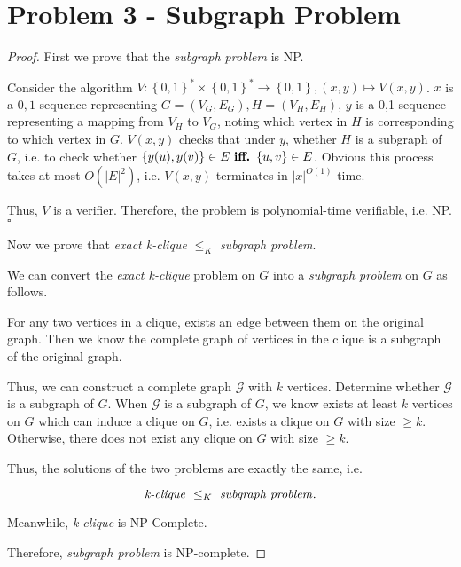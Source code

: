 \documentclass{article}
\newcommand{\whiteqed}{\hfill $\square$\par}
\newcommand{\set}[1]{\left\{#1\right\}}
\begin{document}
\vspace{1em}
\section{Problem 3 - Subgraph Problem}
\vspace{1em}
\begin{proof}
    First we prove that the \textit{subgraph problem} is NP.
    
    \hspace{1.3em}
    Consider the algorithm $V:\set{0,1}^*\times\set{0,1}^*\rightarrow\set{0,1},(x,y)\mapsto V(x,y)$. $x$ is a $0,1$-sequence representing $G=(V_G,E_G),H=(V_H,E_H)$, $y$ is a 0,1-sequence representing a mapping from $V_H$ to $V_G$, noting which vertex in $H$ is corresponding to which vertex in $G$. $V(x,y)$ checks that under $y$, whether $H$ is a subgraph of $G$, i.e. to check whether $\set{y(u),y(v)}\in E\text{\ \textbf{iff.}\ }\set{u,v}\in E$. Obvious this process takes at most $O(|E|^2)$, i.e. $V(x,y)$ terminates in $|x|^{O(1)}$ time.
    
    \hspace{1.3em}
    Thus, $V$ is a verifier. Therefore, the problem is polynomial-time verifiable, i.e. NP. \whiteqed
    
    \vspace{1em} \hspace{1.3em}
    Now we prove that \textit{exact k-clique} $\le_K$ \textit{subgraph problem}.
    
    \hspace{1.3em}
    We can convert the \textit{exact k-clique} problem on $G$ into a \textit{subgraph problem} on $G$ as follows.
    
    \hspace{1.3em}
    For any two vertices in a clique, exists an edge between them on the original graph. Then we know the complete graph of vertices in the clique is a subgraph of the original graph.
    
    \hspace{1.3em}
    Thus, we can construct a complete graph $\mathcal{G}$ with $k$ vertices. Determine whether $\mathcal{G}$ is a subgraph of $G$. When $\mathcal{G}$ is a subgraph of $G$, we know exists at least $k$ vertices on $G$ which can induce a clique on $G$, i.e. exists a clique on $G$ with size $\geq k$. Otherwise, there does not exist any clique on $G$ with size $\geq k$. 
    
    \hspace{1.3em}
    Thus, the solutions of the two problems are exactly the same, i.e.
    
    \vspace{-1.5em}
    $$\text{\textit{k-clique}}\ \le_K\ \text{\textit{subgraph problem}}.$$
    
    \hspace{1.3em}
    Meanwhile, \textit{k-clique} is NP-Complete.
    
    \hspace{1.3em}
    Therefore, \textit{subgraph problem} is NP-complete.
\end{proof}
\end{document}
